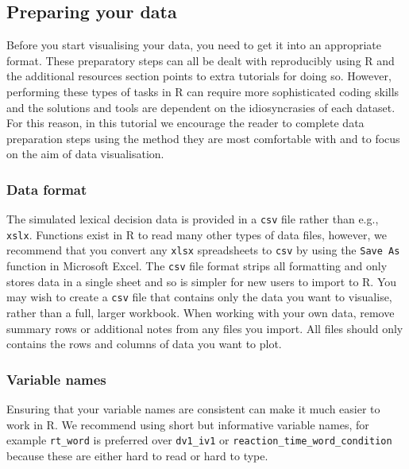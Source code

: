 \documentclass[
  english,
  doc,floatsintext]{apa6}
\begin{document}
\hypertarget{preparing-your-data}{%
\subsection{Preparing your data}\label{preparing-your-data}}

Before you start visualising your data, you need to get it into an appropriate format. These preparatory steps can all be dealt with reproducibly using R and the additional resources section points to extra tutorials for doing so. However, performing these types of tasks in R can require more sophisticated coding skills and the solutions and tools are dependent on the idiosyncrasies of each dataset. For this reason, in this tutorial we encourage the reader to complete data preparation steps using the method they are most comfortable with and to focus on the aim of data visualisation.

\hypertarget{data-format}{%
\subsubsection{Data format}\label{data-format}}

The simulated lexical decision data is provided in a \texttt{csv} file rather than e.g., \texttt{xslx}. Functions exist in R to read many other types of data files, however, we recommend that you convert any \texttt{xlsx} spreadsheets to \texttt{csv} by using the \texttt{Save\ As} function in Microsoft Excel. The \texttt{csv} file format strips all formatting and only stores data in a single sheet and so is simpler for new users to import to R. You may wish to create a \texttt{csv} file that contains only the data you want to visualise, rather than a full, larger workbook. When working with your own data, remove summary rows or additional notes from any files you import. All files should only contains the rows and columns of data you want to plot.

\hypertarget{variable-names}{%
\subsubsection{Variable names}\label{variable-names}}

Ensuring that your variable names are consistent can make it much easier to work in R. We recommend using short but informative variable names, for example \texttt{rt\_word} is preferred over \texttt{dv1\_iv1} or \texttt{reaction\_time\_word\_condition} because these are either hard to read or hard to type.
\end{document}
